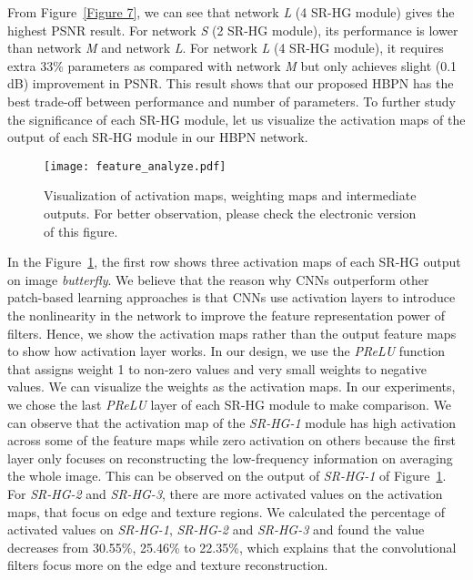 \documentclass[10pt,twocolumn,letterpaper]{article}
\begin{document}
From Figure~\ref{Figure 7}, we can see that network \textit{L} (4 SR-HG module) gives the highest PSNR result. For network \textit{S} (2 SR-HG module), its performance is lower than network \textit{M} and network \textit{L}. For network \textit{L} (4 SR-HG module), it requires extra 33\% parameters as compared with network \textit{M} but only achieves slight (0.1 dB) improvement in PSNR. This result shows that our proposed HBPN has the best trade-off between performance and number of parameters. To further study the significance of each SR-HG module, let us visualize the activation maps of the output of each SR-HG module in our HBPN network. 

\begin{figure}[htb]
\vskip 0.01in
\begin{center}
\centerline{\texttt{[image: feature\_analyze.pdf]}}
\caption{Visualization of activation maps, weighting maps and intermediate outputs. For better observation, please check the electronic version of this figure.}
\label{Figure 8}
\end{center}
\vskip -0.5in
\end{figure}

In the Figure~\ref{Figure 8}, the first row shows three activation maps of each SR-HG output on image \textit{butterfly}. We believe that the reason why CNNs outperform other patch-based learning approaches is that CNNs use activation layers to introduce the nonlinearity in the network to improve the feature representation power of filters. Hence, we show the activation maps rather than the output feature maps to show how activation layer works. In our design, we use the \textit{PReLU} function that assigns weight 1 to non-zero values and very small weights to negative values. We can visualize the weights as the activation maps. In our experiments, we chose the last \textit{PReLU} layer of each SR-HG module to make comparison. We can observe that the activation map of the \textit{SR-HG-1} module has high activation across some of the feature maps while zero activation on others because the first layer only focuses on reconstructing the low-frequency information on averaging the whole image. This can be observed on the output of \textit{SR-HG-1} of Figure~\ref{Figure 8}. For \textit{SR-HG-2} and \textit{SR-HG-3}, there are more activated values on the activation maps, that focus on edge and texture regions. We calculated the percentage of activated values on \textit{SR-HG-1}, \textit{SR-HG-2} and \textit{SR-HG-3} and found the value decreases from 30.55\%, 25.46\% to 22.35\%, which explains that the convolutional filters focus more on the edge and texture reconstruction.
\end{document}
